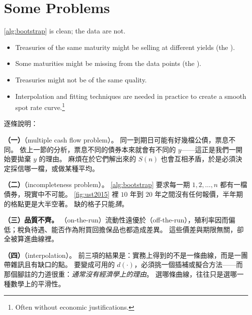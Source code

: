 \section{Some Problems}
\label{sec:ts-problems}


\autoref{alg:bootstrap} is clean; the data are not.

\begin{itemize}[itemsep=0.35em]
	\item Treasuries of the same maturity might be selling at different yields (the ).
	\item Some maturities might be missing from the data points (the ).
	\item Treasuries might not be of the same quality.
	\item Interpolation and fitting techniques are needed in practice to create a smooth spot rate curve.\footnote{Often without economic justifications.}
\end{itemize}

\suppstart
\begin{remark}
	逐條說明：

	\textbf{（一）}（multiple cash flow problem）。
	同一到期日可能有好幾檔公債，票息不同。
	依上一節的分析，票息不同的債券本來就會有不同的 $y$——這正是我們一開始要拋棄 $y$ 的理由。
	麻煩在於它們解出來的 $S(n)$ 也會互相矛盾，於是必須決定採信哪一檔，或做某種平均。

	\textbf{（二）}（incompleteness problem）。
	\autoref{alg:bootstrap} 要求每一期 $1,2,\ldots,n$ 都有一檔債券，現實中不可能。
	\autoref{fig:ust2015} 裡 $10$ 年到 $20$ 年之間沒有任何報價，半年期的格點更是大半空著。
	缺的格子只能\emph{猜}。

	\textbf{（三）品質不齊。}
	（on-the-run）流動性遠優於（off-the-run），殖利率因而偏低；稅負待遇、能否作為附買回擔保品也都造成差異。
	這些價差與期限無關，卻全被算進曲線裡。

	\textbf{（四）}（interpolation）。
	前三項的結果是：實務上得到的不是一條曲線，而是一團帶雜訊且有缺口的點。
	要變成可用的 $d(\cdot)$，必須挑一個插補或擬合方法——而那個腳註的力道很重：\emph{通常沒有經濟學上的理由}。
	選哪條曲線，往往只是選哪一種數學上的平滑性。
\end{remark}

